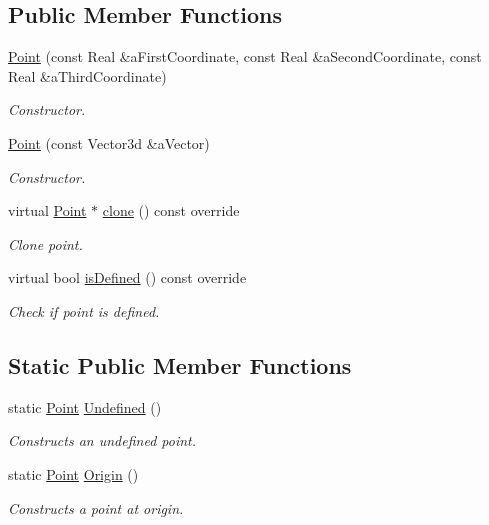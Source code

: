 \subsection*{Public Member Functions}
\begin{DoxyCompactItemize}
\item 
\hyperlink{classlibrary_1_1math_1_1geom_1_1d3_1_1objects_1_1_point_a617e690ab6091af3de729cee337e309e}{Point} (const Real \&a\+First\+Coordinate, const Real \&a\+Second\+Coordinate, const Real \&a\+Third\+Coordinate)
\begin{DoxyCompactList}\small\item\em Constructor. \end{DoxyCompactList}\item 
\hyperlink{classlibrary_1_1math_1_1geom_1_1d3_1_1objects_1_1_point_aa247b14e8237860aafa86bee66f074e0}{Point} (const Vector3d \&a\+Vector)
\begin{DoxyCompactList}\small\item\em Constructor. \end{DoxyCompactList}\item 
virtual \hyperlink{classlibrary_1_1math_1_1geom_1_1d3_1_1objects_1_1_point}{Point} $\ast$ \hyperlink{classlibrary_1_1math_1_1geom_1_1d3_1_1objects_1_1_point_a32aa1e233c6ac5341605961f6bf0f210}{clone} () const override
\begin{DoxyCompactList}\small\item\em Clone point. \end{DoxyCompactList}\item 
virtual bool \hyperlink{classlibrary_1_1math_1_1geom_1_1d3_1_1objects_1_1_point_a9874289efeb457ada4b32d7eb1e012f6}{is\+Defined} () const override
\begin{DoxyCompactList}\small\item\em Check if point is defined. \end{DoxyCompactList}\end{DoxyCompactItemize}
\subsection*{Static Public Member Functions}
\begin{DoxyCompactItemize}
\item 
static \hyperlink{classlibrary_1_1math_1_1geom_1_1d3_1_1objects_1_1_point}{Point} \hyperlink{classlibrary_1_1math_1_1geom_1_1d3_1_1objects_1_1_point_a7c4c9c71f9b29b85925d8a7ed4943501}{Undefined} ()
\begin{DoxyCompactList}\small\item\em Constructs an undefined point. \end{DoxyCompactList}\item 
static \hyperlink{classlibrary_1_1math_1_1geom_1_1d3_1_1objects_1_1_point}{Point} \hyperlink{classlibrary_1_1math_1_1geom_1_1d3_1_1objects_1_1_point_ab2a38e285c562e50bf350272c083986f}{Origin} ()
\begin{DoxyCompactList}\small\item\em Constructs a point at origin. \end{DoxyCompactList}\end{DoxyCompactItemize}
